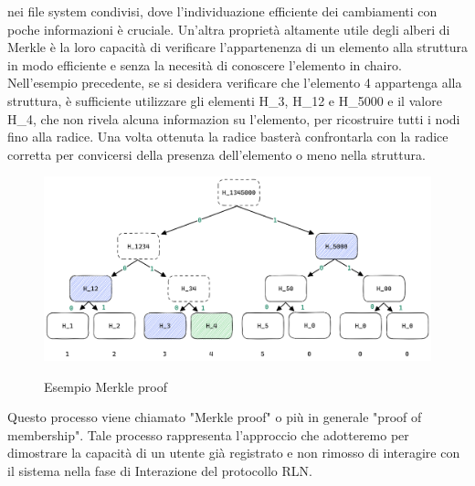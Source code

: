 nei file system condivisi, dove l'individuazione efficiente dei cambiamenti con poche informazioni è cruciale. Un'altra
proprietà altamente utile degli alberi di Merkle è la loro capacità di verificare l'appartenenza di un elemento alla
struttura in modo efficiente e senza la necesità di conoscere l'elemento in chairo. Nell'esempio precedente, se si
desidera verificare che l'elemento 4 appartenga alla struttura, è sufficiente utilizzare gli elementi H\_3, H\_12 e
H\_5000 e il valore H\_4, che non rivela alcuna informazion su l'elemento, per ricostruire tutti i nodi fino alla
radice. Una volta ottenuta la radice basterà confrontarla con la radice corretta per convicersi della presenza
dell'elemento o meno nella struttura.
\begin{figure}[H]
    \centering
    \includegraphics[width=15cm]{./chapters/2.rln-protocol/images/2.merkle_proof.png}
    \label{fig:merkle_proof}
    \captionsetup{justification=centering}
    \caption{Esempio Merkle proof}
\end{figure}
Questo processo viene chiamato "Merkle proof" o più in generale "proof of membership". Tale processo rappresenta
l'approccio che adotteremo per dimostrare la capacità di un utente già registrato e non rimosso di interagire con il
sistema nella fase di Interazione del protocollo RLN.

